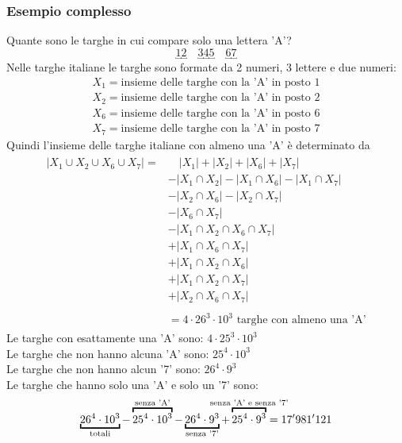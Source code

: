 \documentclass[italian]{article}
\begin{document}
\subsubsection{Esempio complesso}
Quante sono le targhe in cui compare solo una lettera 'A'?
\[
	\underbracket{1} \underbracket{2} \quad \underbracket{3} \underbracket{4} \underbracket{5} \quad \underbracket{6} \underbracket{7}
\]
Nelle targhe italiane le targhe sono formate da 2 numeri, 3 lettere e due numeri:
\begin{gather*}
	X_1 = \text{insieme delle targhe con la 'A' in posto 1} \\
	X_2 = \text{insieme delle targhe con la 'A' in posto 2} \\
	X_6 = \text{insieme delle targhe con la 'A' in posto 6} \\
	X_7 = \text{insieme delle targhe con la 'A' in posto 7}
\end{gather*}
Quindi l'insieme delle targhe italiane con almeno una 'A' è determinato da
\begin{gather*}
		\begin{split}
			|X_1 \cup X_2 \cup X_6 \cup X_7| = &\quad |X_1| + |X_2| + |X_6| + |X_7| \\
			& - |X_1 \cap X_2| - |X_1 \cap X_6| - |X_1 \cap X_7| \\
			& - |X_2 \cap X_6| - |X_2 \cap X_7| \\
			& - |X_6 \cap X_7| \\
			& - |X_1 \cap X_2 \cap X_6 \cap X_7| \\
			& + |X_1 \cap X_6 \cap X_7| \\
			& + |X_1 \cap X_2 \cap X_6| \\
			& + |X_1 \cap X_2 \cap X_7| \\
			& + |X_2 \cap X_6 \cap X_7| \\\\
			&= 4 \cdot 26^3 \cdot 10^3 \text{ targhe con almeno una 'A'}
		\end{split}
\end{gather*}
Le targhe con esattamente una 'A' sono: $4\cdot 25^3 \cdot 10^3$ \\[2mm]
Le targhe che non hanno alcuna 'A' sono: $25^4 \cdot 10^3$ \\[2mm]
Le targhe che non hanno alcun '7' sono: $26^4 \cdot 9^3$ \\[2mm]
Le targhe che hanno solo una 'A' e solo un '7' sono: 
\[
	\underbracket{26^4 \cdot 10^3}_{\mathclap{\text{totali}}} - \overbracket{25^4\cdot 10^3}^{\mathclap{\text{senza 'A'}}} - \underbracket{26^4\cdot 9^3}_{\mathclap{\text{senza '7'}}} + \overbracket{25^4\cdot9^3}^{\mathclap{\text{senza 'A' e senza '7'}}} = 17'981'121
\]
\end{document}
